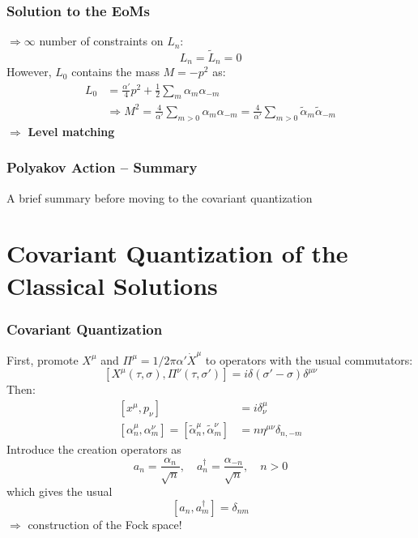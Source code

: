 \documentclass[aspectratio=169]{beamer}
\begin{document}
	\begin{frame}
		\frametitle{Solution to the EoMs}
		$\Rightarrow \infty$ number of constraints on $L_n$: 
		\begin{equation*}
			L_n = \tilde{L}_n = 0
		\end{equation*}
		However, $L_0$ contains the mass $M = -p^2$ as:
		\begin{align*}
			L_0 &= \frac{\alpha'}{4}p^2 + \frac{1}{2} \sum_{m} \alpha_m \alpha_{-m} \\
			& \Rightarrow M^2 = \frac{4}{\alpha'} \sum_{m>0}\alpha_m\alpha_{-m} = \frac{4}{\alpha'} \sum_{m>0}\tilde{\alpha}_m\tilde{\alpha}_{-m}
		\end{align*}
		$\Rightarrow$ \textbf{Level matching}
	\end{frame}

	\begin{frame}
		\frametitle{Polyakov Action -- Summary}
		{\Huge \color{red} A brief summary before moving to the covariant quantization}
	\end{frame}

	\section{Covariant Quantization of the  Classical Solutions}	

	\begin{frame}
		\frametitle{Covariant Quantization}
		First, promote $X^\mu$ and $\Pi^\mu = 1/2\pi\alpha' \dot{X}^\mu$ to operators with the usual commutators:
		\begin{equation*}
			\left[X^\mu(\tau,\sigma), \Pi^\nu(\tau,\sigma')\right] = i\delta(\sigma'-\sigma)\delta^{\mu\nu}
		\end{equation*}
		Then:
		\begin{align*}
			\left[x^\mu,p_\nu\right] &= i\delta^\mu_\nu \\
			\left[\alpha^\mu_n, \alpha^\nu_m\right] = \left[\tilde{\alpha}^\mu_n, \tilde{\alpha}^\nu_m\right] &= n \eta^{\mu\nu} \delta_{n,-m}
		\end{align*}
		Introduce the creation operators as
		\begin{equation*}
			a_n = \frac{\alpha_n}{\sqrt{n}}, \quad a^\dagger_n = \frac{\alpha_{-n}}{\sqrt{n}}, \quad n>0
		\end{equation*}
		which gives the usual
		\begin{equation*}
			\left[a_n,a^\dagger_m\right] = \delta_{nm}
		\end{equation*}
		$\Rightarrow$ construction of the Fock space!
	\end{frame}
\end{document}
